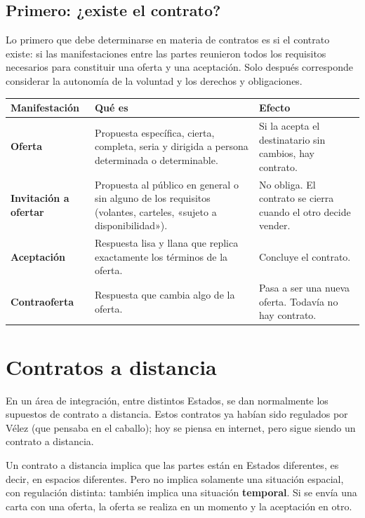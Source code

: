 \documentclass[12pt,oneside]{book}
\begin{document}
\subsection{Primero: ¿existe el contrato?}

Lo primero que debe determinarse en materia de contratos es si el contrato existe: si las manifestaciones entre las partes reunieron todos los requisitos necesarios para constituir una oferta y una aceptación. Solo después corresponde considerar la autonomía de la voluntad y los derechos y obligaciones.

\begin{table}[H]
\centering
\small
\begin{tabular}{@{}L{0.17\textwidth}L{0.42\textwidth}L{0.33\textwidth}@{}}
\toprule
\textbf{Manifestación} & \textbf{Qué es} & \textbf{Efecto} \\
\midrule
\textbf{Oferta} & Propuesta específica, cierta, completa, seria y dirigida a persona determinada o determinable. & Si la acepta el destinatario sin cambios, hay contrato. \\
\textbf{Invitación a ofertar} & Propuesta al público en general o sin alguno de los requisitos (volantes, carteles, «sujeto a disponibilidad»). & No obliga. El contrato se cierra cuando el otro decide vender. \\
\textbf{Aceptación} & Respuesta lisa y llana que replica exactamente los términos de la oferta. & Concluye el contrato. \\
\textbf{Contraoferta} & Respuesta que cambia algo de la oferta. & Pasa a ser una nueva oferta. Todavía no hay contrato. \\
\bottomrule
\end{tabular}
\end{table}

\section{Contratos a distancia}

En un área de integración, entre distintos Estados, se dan normalmente los supuestos de contrato a distancia. Estos contratos ya habían sido regulados por Vélez (que pensaba en el caballo); hoy se piensa en internet, pero sigue siendo un contrato a distancia.

Un contrato a distancia implica que las partes están en Estados diferentes, es decir, en espacios diferentes. Pero no implica solamente una situación espacial, con regulación distinta: también implica una situación \textbf{temporal}. Si se envía una carta con una oferta, la oferta se realiza en un momento y la aceptación en otro.
\end{document}

